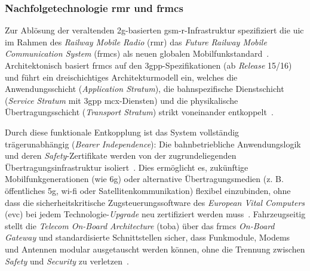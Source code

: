 \documentclass[runningheads]{res/llncs}
\begin{document}

\subsubsection{\texorpdfstring{Nachfolgetechnologie \gls{rmr} und \gls{frmcs}}{Nachfolgetechnologie RMR und FRMCS}}
\label{sec:Nachfolgetechnologie_RMR_und_FRMCS}
Zur Ablösung der veraltenden \gls{2g}-basierten \gls{gsm-r}-Infrastruktur spezifiziert die \gls{uic} im Rahmen des \textit{Railway Mobile Radio} (\gls{rmr}) das \textit{Future Railway Mobile Communication System} (\gls{frmcs}) als neuen globalen Mobilfunkstandard~\parencite[S. 49, 123]{trinckaufETCS2024}. Architektonisch basiert \gls{frmcs} auf den \gls{3gpp}-Spezifikationen (ab \textit{Release} 15/16) und führt ein dreischichtiges Architekturmodell ein, welches die Anwendungsschicht (\textit{Application Stratum}), die bahnspezifische Dienstschicht (\textit{Service Stratum} mit \gls{3gpp} \gls{mcx}-Diensten) und die physikalische Übertragungsschicht (\textit{Transport Stratum}) strikt voneinander entkoppelt~\parencite[S. 123]{trinckaufETCS2024}. 

Durch diese funktionale Entkopplung ist das System vollständig trägerunabhängig (\textit{Bearer Independence}): Die bahnbetriebliche Anwendungslogik und deren \textit{Safety}-Zertifikate werden von der zugrundeliegenden Übertragungsinfrastruktur isoliert~\parencite[S. 123, 211]{trinckaufETCS2024}. Dies ermöglicht es, zukünftige Mobilfunkgenerationen (wie \gls{6g}) oder alternative Übertragungsmedien (z. B. öffentliches \gls{5g}, \gls{wi-fi} oder Satellitenkommunikation) flexibel einzubinden, ohne dass die sicherheitskritische Zugsteuerungssoftware des \textit{European Vital Computers} (\gls{evc}) bei jedem Technologie-\textit{Upgrade} neu zertifiziert werden muss~\parencite[S. 123, 211]{trinckaufETCS2024}. Fahrzeugseitig stellt die \textit{Telecom On-Board Architecture} (\gls{toba}) über das \gls{frmcs} \textit{On-Board Gateway} und standardisierte Schnittstellen sicher, dass Funkmodule, Modems und Antennen modular ausgetauscht werden können, ohne die Trennung zwischen \textit{Safety} und \textit{Security} zu verletzen~\parencite[S. 123, 219]{trinckaufETCS2024}.
\end{document}
